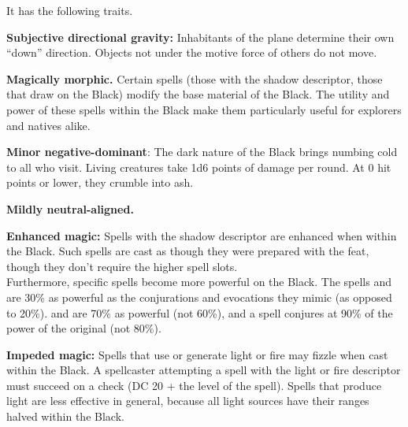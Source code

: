It has the following traits.

\begin{itemize*}
\item \textbf{Subjective directional gravity:} Inhabitants of the plane determine their own ``down'' direction. Objects not under the motive force of others do not move.
\item \textbf{Magically morphic.} Certain spells (those with the shadow descriptor, those that draw on the Black) modify the base material of the Black. The utility and power of these spells within the Black make them particularly useful for explorers and natives alike.
\item \textbf{Minor negative-dominant}: The dark nature of the Black brings numbing cold to all who visit. Living creatures take 1d6 points of damage per round. At 0 hit points or lower, they crumble into ash.
\item \textbf{Mildly neutral-aligned.}
\item \textbf{Enhanced magic:} Spells with the shadow descriptor are enhanced when within the Black. Such spells are cast as though they were prepared with the  feat, though they don't require the higher spell slots.\\

Furthermore, specific spells become more powerful on the Black. The spells  and  are 30\% as powerful as the conjurations and evocations they mimic (as opposed to 20\%).  and  are 70\% as powerful (not 60\%), and a  spell conjures at 90\% of the power of the original (not 80\%).

\item \textbf{Impeded magic:} Spells that use or generate light or fire may fizzle when cast within the Black. A spellcaster attempting a spell with the light or fire descriptor must succeed on a  check (DC 20 + the level of the spell). Spells that produce light are less effective in general, because all light sources have their ranges halved within the Black.
\end{itemize*}
